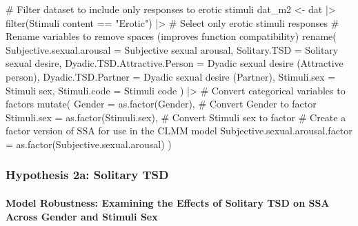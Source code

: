 \documentclass[
  bookmarksnumbered]{article}
\newenvironment{Shaded}{\begin{snugshade}}{\end{snugshade}}
\newcommand{\AttributeTok}[1]{\textcolor[rgb]{0.80,0.80,0.80}{#1}}
\newcommand{\CommentTok}[1]{\textcolor[rgb]{0.50,0.62,0.50}{#1}}
\newcommand{\FunctionTok}[1]{\textcolor[rgb]{0.94,0.94,0.56}{#1}}
\newcommand{\NormalTok}[1]{\textcolor[rgb]{0.80,0.80,0.80}{#1}}
\newcommand{\OtherTok}[1]{\textcolor[rgb]{0.94,0.94,0.56}{#1}}
\newcommand{\SpecialCharTok}[1]{\textcolor[rgb]{0.86,0.64,0.64}{#1}}
\newcommand{\StringTok}[1]{\textcolor[rgb]{0.80,0.58,0.58}{#1}}
\begin{document}
\begin{Shaded}
\begin{Highlighting}[]
\CommentTok{\# Filter dataset to include only responses to erotic stimuli}
\NormalTok{dat\_m2 }\OtherTok{\textless{}{-}}\NormalTok{ dat }\SpecialCharTok{|\textgreater{}}
  \FunctionTok{filter}\NormalTok{(}\StringTok{\textasciigrave{}}\AttributeTok{Stimuli content}\StringTok{\textasciigrave{}} \SpecialCharTok{==} \StringTok{"Erotic"}\NormalTok{) }\SpecialCharTok{|\textgreater{}} \CommentTok{\# Select only erotic stimuli responses}
  \CommentTok{\# Rename variables to remove spaces (improves function compatibility)}
  \FunctionTok{rename}\NormalTok{(}
    \AttributeTok{Subjective.sexual.arousal =} \StringTok{\textasciigrave{}}\AttributeTok{Subjective sexual arousal}\StringTok{\textasciigrave{}}\NormalTok{,}
    \AttributeTok{Solitary.TSD =} \StringTok{\textasciigrave{}}\AttributeTok{Solitary sexual desire}\StringTok{\textasciigrave{}}\NormalTok{,}
    \AttributeTok{Dyadic.TSD.Attractive.Person =} \StringTok{\textasciigrave{}}\AttributeTok{Dyadic sexual desire (Attractive person)}\StringTok{\textasciigrave{}}\NormalTok{,}
    \AttributeTok{Dyadic.TSD.Partner =} \StringTok{\textasciigrave{}}\AttributeTok{Dyadic sexual desire (Partner)}\StringTok{\textasciigrave{}}\NormalTok{,}
    \AttributeTok{Stimuli.sex =} \StringTok{\textasciigrave{}}\AttributeTok{Stimuli sex}\StringTok{\textasciigrave{}}\NormalTok{,}
    \AttributeTok{Stimuli.code =} \StringTok{\textasciigrave{}}\AttributeTok{Stimuli code}\StringTok{\textasciigrave{}}
\NormalTok{  ) }\SpecialCharTok{|\textgreater{}}
  \CommentTok{\# Convert categorical variables to factors}
  \FunctionTok{mutate}\NormalTok{(}
    \AttributeTok{Gender =} \FunctionTok{as.factor}\NormalTok{(Gender), }\CommentTok{\# Convert Gender to factor}
    \AttributeTok{Stimuli.sex =} \FunctionTok{as.factor}\NormalTok{(Stimuli.sex), }\CommentTok{\# Convert Stimuli sex to factor}
    \CommentTok{\# Create a factor version of SSA for use in the CLMM model}
    \AttributeTok{Subjective.sexual.arousal.factor =} \FunctionTok{as.factor}\NormalTok{(Subjective.sexual.arousal)}
\NormalTok{  )}
\end{Highlighting}
\end{Shaded}

\subsubsection{Hypothesis 2a: Solitary TSD}\label{hyp2a}

\paragraph{Model Robustness: Examining the Effects of Solitary TSD on SSA Across Gender and Stimuli Sex}\label{model-robustness-examining-the-effects-of-solitary-tsd-on-ssa-across-gender-and-stimuli-sex}
\end{document}
